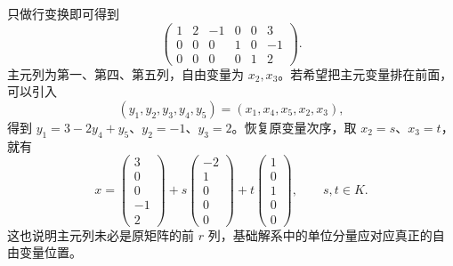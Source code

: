 \begin{solve}
只做行变换即可得到
\[
    \left(\begin{array}{ccccc|c}
        1&2&-1&0&0&3\\
        0&0&0&1&0&-1\\
        0&0&0&0&1&2
    \end{array}\right).
\]
主元列为第一、第四、第五列，自由变量为 $x_2,x_3$。若希望把主元变量排在前面，可以引入
\[
    (y_1,y_2,y_3,y_4,y_5)=(x_1,x_4,x_5,x_2,x_3),
\]
得到 $y_1=3-2y_4+y_5$、$y_2=-1$、$y_3=2$。恢复原变量次序，取 $x_2=s$、$x_3=t$，就有
\[
    x=\begin{pmatrix}3\\0\\0\\-1\\2\end{pmatrix}
      +s\begin{pmatrix}-2\\1\\0\\0\\0\end{pmatrix}
      +t\begin{pmatrix}1\\0\\1\\0\\0\end{pmatrix},\qquad s,t\in K.
\]
这也说明主元列未必是原矩阵的前 $r$ 列，基础解系中的单位分量应对应真正的自由变量位置。
\end{solve}







